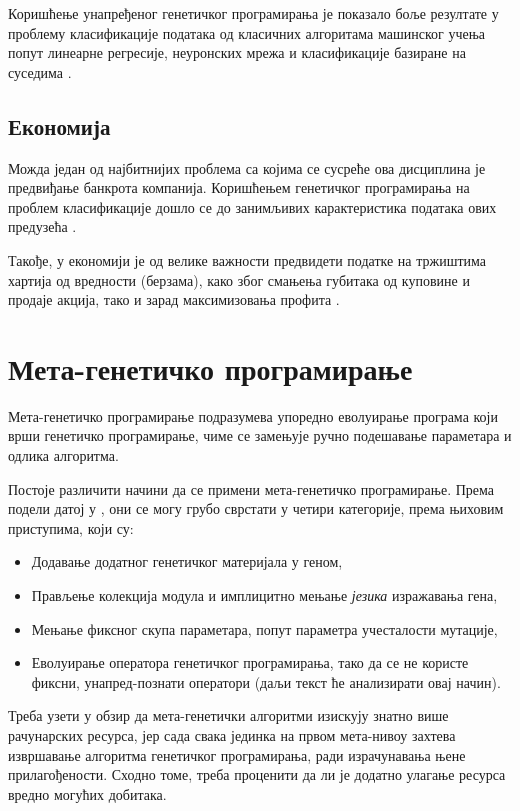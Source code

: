 \documentclass[a4paper]{article}
\begin{document}
Коришћење унапређеног генетичког програмирања је показало боље резултате у проблему класификације података од класичних алгоритама машинског учења попут линеарне регресије, неуронских мрежа и класификације базиране на суседима \cite{egp}.

\subsection{Економија}
Можда један од најбитнијих проблема са којима се сусреће ова дисциплина је предвиђање банкрота компанија. Коришћењем генетичког програмирања на проблем класификације дошло се до занимљивих карактеристика података ових предузећа \cite{bankruptcy}.

Такође, у економији је од велике важности предвидети податке на тржиштима хартија од вредности (берзама), како због смањења губитака од куповине и продаје акција, тако и зарад максимизовања профита \cite{stock}.

\section{Мета-генетичко програмирање}

Мета-генетичко програмирање подразумева упоредно еволуирање програма који врши генетичко програмирање, чиме се замењује ручно подешавање параметара и одлика алгоритма.


Постоје различити начини да се примени мета-генетичко програмирање. Према подели датој у \cite{edmonds2001meta}, они се могу грубо сврстати у четири категорије, према њиховим приступима, који су:

\begin{itemize}
    \item Додавање додатног генетичког материјала у геном,
    \item Прављење колекција модула и имплицитно мењање \emph{језика} изражавања гена,
    \item Мењање фиксног скупа параметара, попут параметра учесталости мутације,
    \item Еволуирање оператора генетичког програмирања, тако да се не користе фиксни, унапред-познати оператори (даљи текст ће анализирати овај начин).
\end{itemize}

Треба узети у обзир да мета-генетички алгоритми изискују знатно више рачунарских ресурса, јер сада свака јединка на првом мета-нивоу захтева извршавање алгоритма генетичког програмирања, ради израчунавања њене прилагођености. Сходно томе, треба проценити да ли је додатно улагање ресурса вредно могућих добитака.
\end{document}
